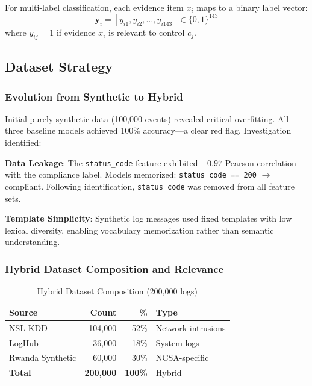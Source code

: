 \documentclass[11pt,conference]{IEEEtran}
\begin{document}
For multi-label classification, each evidence item $x_i$ maps to a binary label vector:
\begin{equation}
\mathbf{y}_i = [y_{i1}, y_{i2}, \ldots, y_{i143}] \in \{0,1\}^{143}
\end{equation}
where $y_{ij} = 1$ if evidence $x_i$ is relevant to control $c_j$.

\subsection{Dataset Strategy}

\subsubsection{Evolution from Synthetic to Hybrid}

Initial purely synthetic data (100,000 events) revealed critical overfitting. All three baseline models achieved 100\% accuracy---a clear red flag. Investigation identified:

\textbf{Data Leakage}: The \texttt{status\_code} feature exhibited $-0.97$ Pearson correlation with the compliance label. Models memorized: \texttt{status\_code == 200} $\rightarrow$ compliant. Following identification, \texttt{status\_code} was removed from all feature sets.

\textbf{Template Simplicity}: Synthetic log messages used fixed templates with low lexical diversity, enabling vocabulary memorization rather than semantic understanding.

\subsubsection{Hybrid Dataset Composition and Relevance}

\begin{table}[!t]
\centering
\caption{Hybrid Dataset Composition (200,000 logs)}
\label{tab:dataset}
\begin{tabular}{@{}lrrp{3cm}@{}}
\toprule
\textbf{Source} & \textbf{Count} & \textbf{\%} & \textbf{Type} \\
\midrule
NSL-KDD \cite{nslkdd} & 104,000 & 52\% & Network intrusions \\
LogHub \cite{loghub} & 36,000 & 18\% & System logs \\
Rwanda Synthetic & 60,000 & 30\% & NCSA-specific \\
\midrule
\textbf{Total} & \textbf{200,000} & \textbf{100\%} & Hybrid \\
\bottomrule
\end{tabular}
\end{table}
\end{document}
